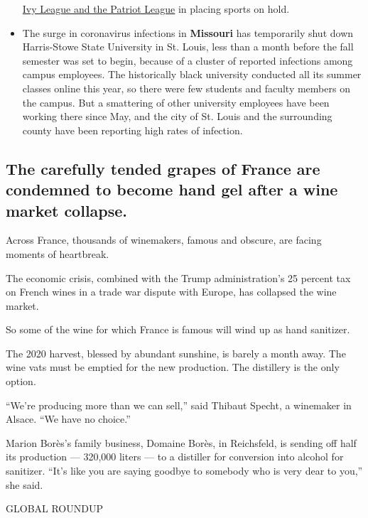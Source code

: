 \begin{itemize}
  \href{https://www.nytimes.com/2020/07/08/sports/ncaafootball/ivy-league-fall-sports-football-coronavirus.html}{Ivy
  League and the Patriot League} in placing sports on hold.
\item
  The surge in coronavirus infections in \textbf{Missouri} has
  temporarily shut down Harris-Stowe State University in St. Louis, less
  than a month before the fall semester was set to begin, because of a
  cluster of reported infections among campus employees. The
  historically black university conducted all its summer classes online
  this year, so there were few students and faculty members on the
  campus. But a smattering of other university employees have been
  working there since May, and the city of St. Louis and the surrounding
  county have been reporting high rates of infection.
\end{itemize}

\hypertarget{the-carefully-tended-grapes-of-france-are-condemned-to-become-hand-gel-after-a-wine-market-collapse}{%
\subsection{The carefully tended grapes of France are condemned to
become hand gel after a wine market
collapse.}\label{the-carefully-tended-grapes-of-france-are-condemned-to-become-hand-gel-after-a-wine-market-collapse}}

Across France, thousands of winemakers, famous and obscure, are facing
moments of heartbreak.

The economic crisis, combined with the Trump administration's 25 percent
tax on French wines in a trade war dispute with Europe, has collapsed
the wine market.

So some of the wine for which France is famous will wind up as hand
sanitizer.

The 2020 harvest, blessed by abundant sunshine, is barely a month away.
The wine vats must be emptied for the new production. The distillery is
the only option.

``We're producing more than we can sell,'' said Thibaut Specht, a
winemaker in Alsace. ``We have no choice.''

Marion Borès's family business, Domaine Borès, in Reichsfeld, is sending
off half its production --- 320,000 liters --- to a distiller for
conversion into alcohol for sanitizer. ``It's like you are saying
goodbye to somebody who is very dear to you,'' she said.

GLOBAL ROUNDUP

